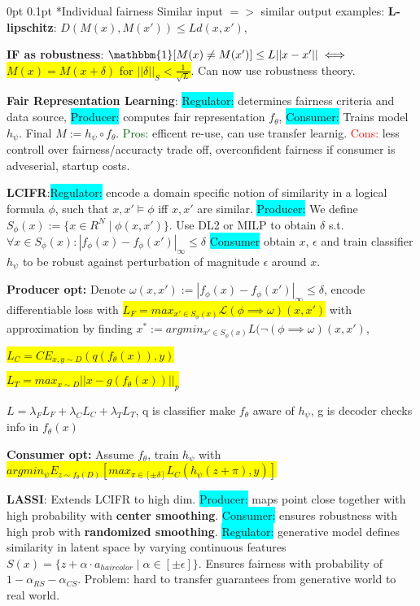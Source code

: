 \documentclass[11pt,landscape,a4paper,fleqn]{article}
\makeatletter
\renewcommand{\subsection}{\@startsection{subsection}{1}{0mm}%
                                {0pt}%
                                {0.1pt}%
                            	{\color{myorange2}\sffamily\small}}
\newcommand{\mhl}[1]{\setlength{\fboxsep}{0pt}\colorbox{yellow}{#1}}
\makeatother
\begin{document}
\begin{multicols*}{4}
\subsection*{Individual fairness}
Similar input $=>$ similar output examples: \textbf{L-lipschitz}: $D(M(x), M(x')) \leq Ld(x, x')$, 

\textbf{IF as robustness}: $\mathbbm{1}[M(x) \neq M(x')] \leq L ||x-x'|| \iff$\mhl{$ M(x) = M(x+\delta)$ for $||\delta||_S < \frac{1}{\sqrt{L}}$}. Can now use robustness theory.

\textbf{Fair Representation Learning}: \colorbox{cyan}{Regulator:} determines fairness criteria and data source, \colorbox{cyan}{Producer:} computes fair representation $f_\theta$, \colorbox{cyan}{Consumer:} Trains model $h_\psi$. Final $M :=  h_\psi \circ f_\theta$. \textcolor{darkgreen}{Pros:} efficent re-use, can use transfer learnig. \textcolor{red}{Cons:} less controll over fairness/accuracty trade off, overconfident fairness if consumer is adveserial, startup costs.

\textbf{LCIFR}:\colorbox{cyan}{Regulator:} encode a domain specific notion of similarity in a logical formula $\phi$, such that $x, x' \models \phi$ iff $x,x'$ are similar.
\colorbox{cyan}{Producer:} We define $S_\phi(x) := \{x\in R^N \mid \phi(x, x')\}$. Use DL2 or MILP to obtain $\delta$ s.t. $\forall x \in S_\phi(x): |f_\phi(x) - f_\phi(x')|_\infty \leq \delta$
\colorbox{cyan}{Consumer} obtain $x$, $\epsilon$ and train classifier $h_\psi$ to be robust against perturbation of magnitude $\epsilon$ around $x$.

\textbf{Producer opt:} Denote $\omega(x,x') := |f_\phi(x) - f_\phi(x')|_\infty \leq \delta$, encode differentiable loss with \mhl{$L_F = max_{x'\in S_\phi(x)} \mathcal{L}(\phi \implies \omega)(x,x')$} with approximation by finding $x^* := argmin_{x'\in S_\phi (x)} L(\lnot (\phi \implies \omega)(x,x')$, 

\mhl{$L_C = CE_{x,y \sim D}(q(f_\theta(x)), y)$}

\mhl{$L_T = max_{x\sim D} ||x - g(f_\theta(x))||_p$}

$L = \lambda_F L_F + \lambda_C L_C + \lambda_T L_T$,
q is classifier make $f_\theta$ aware of $h_\psi$, g is decoder checks info in $f_\theta(x)$

\textbf{Consumer opt:} Assume $f_\theta$, train $h_\psi$ with \mhl{$argmin_\psi E_{z \sim f_\theta(D)}[max_{\pi \in [\pm\delta]}L_C(h_\psi(z+\pi), y)]$}


\textbf{LASSI}: Extends LCIFR to high dim. \colorbox{cyan}{Producer:} maps point close together with high probability with \textbf{center smoothing}. \colorbox{cyan}{Consumer:} ensures robustness with high prob with \textbf{randomized smoothing}. \colorbox{cyan}{Regulator:} generative model defines similarity in latent space by varying continuous features $S(x) = \{z + \alpha \cdot a_{hair color} \mid \alpha \in [\pm \epsilon]\}$. Ensures fairness with probability of $1 - \alpha_{RS} - \alpha_{CS}$. Problem: hard to transfer guarantees from generative world to real world.


\end{multicols*}
\end{document}
